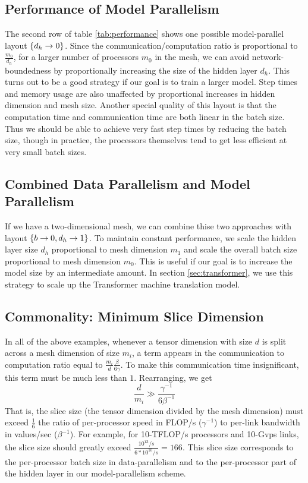 \documentclass{article}
\begin{document}
\begin{itemize}
\subsection{Performance of Model Parallelism}
The second row of table \ref{tab:performance} shows one possible model-parallel layout ${{\{d_h \rightarrow 0\}}}$.  Since the communication/computation ratio is proportional to  $\frac{m_0}{d_h}$, for a larger number of processors $m_0$ in the mesh, we can avoid network-boundedness by proportionally increasing the size of the hidden layer $d_h$.   This turns out to be a good strategy if our goal is to train a larger model.   Step times and memory usage are also unaffected by proportional increases in hidden dimension and mesh size. Another special quality of this layout is that the computation time and communication time are both linear in the batch size.  Thus we should be able to achieve very fast step times by reducing the batch size, though in practice, the processors themselves tend to get less efficient at very small batch sizes.

\subsection{Combined Data Parallelism and Model Parallelism}
If we have a two-dimensional mesh, we can combine thise two approaches with layout $\{b \rightarrow 0, d_h \rightarrow 1\}$.  To maintain constant performance, we scale the hidden layer size $d_h$ proportional to mesh dimension $m_1$ and scale the overall batch size proportional to mesh dimension $m_0$.  This is useful if our goal is to increase the model size by an intermediate amount.  In section \ref{sec:transformer}, we use this strategy to scale up the Transformer machine translation model.



\subsection{Commonality: Minimum Slice Dimension}
In all of the above examples, whenever a tensor dimension with size $d$ is split across a mesh dimension of size $m_i$, a term appears in the communication to computation ratio equal to $\frac{m_i}{d} \frac{\beta}{6\gamma}$.  To make this communication time insignificant, this term must be much less than $1$.  Rearranging, we get
$$\frac{d}{m_i} \gg \frac{\gamma^{-1}}{6\beta^{-1}}$$
That is, the slice size (the tensor dimension divided by the mesh dimension) must exceed $\frac{1}{6}$ the ratio of per-processor speed in FLOP/s ($\gamma^{-1}$) to per-link bandwidth in values/sec ($\beta^{-1}$).  For example, for 10-TFLOP/s processors and 10-Gvps links, the slice size should greatly exceed $\frac{10^{13}/s}{6 * 10^{10}/s} = 166$.  This slice size corresponds to the per-processor batch size in data-parallelism and to the per-processor part of the hidden layer in our model-parallelism scheme.


\end{itemize}
\end{document}
